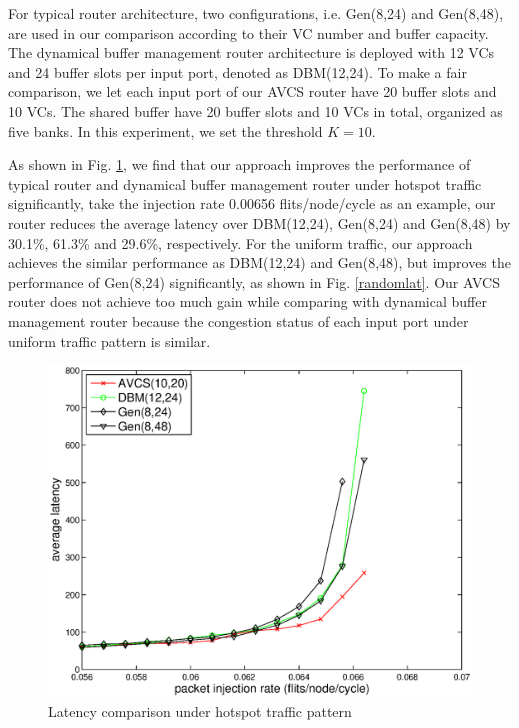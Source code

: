 \documentclass[paper]{ieice}
\begin{document}
For typical router architecture, two configurations, i.e. Gen(8,24) and Gen(8,48), are used in our comparison according to their VC number and buffer capacity. The dynamical buffer management router architecture is deployed with 12 VCs and 24 buffer slots per input port, denoted as DBM(12,24). To make a fair comparison, we let each input port of our AVCS router have 20 buffer slots and 10 VCs. The shared buffer have 20 buffer slots and 10 VCs in total, organized as five banks. In this experiment, we set the threshold $K=10$.

As shown in Fig. \ref{hotspotlat}, we find that our approach improves the performance of typical router and dynamical buffer management router under hotspot traffic significantly, take the injection rate 0.00656 flits/node/cycle as an example, our router reduces the average latency over DBM(12,24), Gen(8,24) and Gen(8,48) by 30.1\%, 61.3\% and 29.6\%, respectively. For the uniform traffic, our approach achieves the similar performance as DBM(12,24) and Gen(8,48), but improves the performance of Gen(8,24) significantly, as shown in Fig. \ref{randomlat}. Our AVCS router does not achieve too much gain while comparing with dynamical buffer management router because the congestion status of each input port under uniform traffic pattern is similar.
\begin{figure}[h]
  \centering
  \includegraphics[scale=0.4]{figures/hotspotlat.eps}
  \caption{Latency comparison under hotspot traffic pattern}\label{hotspotlat}
\end{figure}
\end{document}
